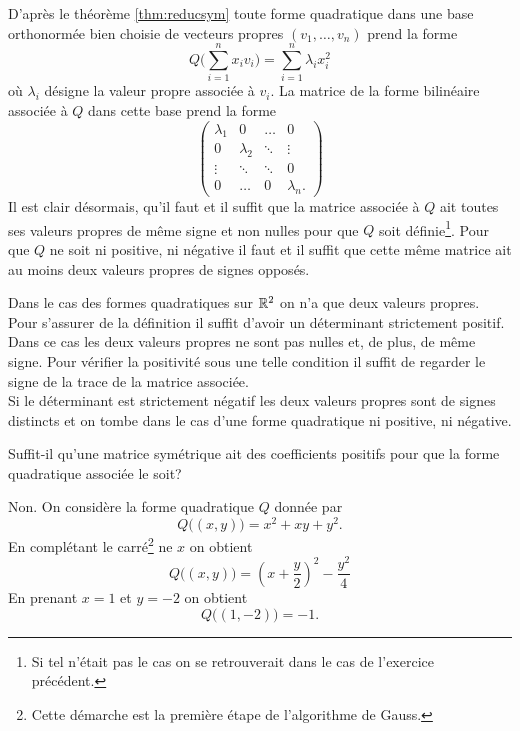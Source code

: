 \documentclass[11pt, a4paper]{article}
\begin{document}
\begin{solution}
  D'après le théorème \eqref{thm:reducsym} toute forme quadratique
  dans une base orthonormée bien choisie de vecteurs propres
  $(v_1, \ldots, v_n)$ prend la forme
  \[
  Q\Big(\sum_{i=1}^n x_i v_i\Big) = \sum_{i=1}^n \lambda_i x_i^2
  \]
  où $\lambda_i$ désigne la valeur propre associée à $v_i$. La matrice
  de la forme bilinéaire associée à $Q$ dans cette base prend la forme
  \[
  \begin{pmatrix}
    \lambda_1 & 0 & \hdots & 0 \\
    0 & \lambda_2 & \ddots & \vdots \\
    \vdots & \ddots & \ddots & 0 \\
    0 & \hdots & 0 & \lambda_n. 
  \end{pmatrix}
  \]
  Il est clair désormais, qu'il faut et il suffit que la matrice
  associée à $Q$ ait toutes ses valeurs propres de même signe et non
  nulles pour que $Q$ soit définie\footnote{Si tel n'était pas le cas
    on se retrouverait dans le cas de l'exercice précédent.}. Pour que
  $Q$ ne soit ni positive, ni négative il faut et il suffit que cette
  même matrice ait au moins deux valeurs propres de signes opposés.

  Dans le cas des formes quadratiques sur $\mathbb{R}^2$ on n'a que deux
  valeurs propres. Pour s'assurer de la définition il suffit d'avoir
  un déterminant strictement positif. Dans ce cas les deux valeurs
  propres ne sont pas nulles et, de plus, de même signe. Pour vérifier
  la positivité sous une telle condition il suffit de regarder le
  signe de la trace de la matrice associée. \\
  Si le déterminant est strictement négatif les deux valeurs propres
  sont de signes distincts et on tombe dans le cas d'une forme
  quadratique ni positive, ni négative.
\end{solution}

\begin{question}
  Suffit-il qu'une matrice symétrique ait des coefficients positifs
  pour que la forme quadratique associée le soit? 
\end{question}

\begin{solution}
  Non. On considère la forme quadratique $Q$ donnée par 
  \[
  Q\big((x,y)\big) = x^2 + xy + y^2.
  \]
  En complétant le carré\footnote{Cette démarche est la première étape
    de l'algorithme de Gauss.} ne $x$ on obtient
  \[
  Q\big((x, y)\big) = \left(x + \frac{y}{2}\right)^2 - \frac{y^2}{4}
  \]
  En prenant $x = 1$ et $y = -2$ on obtient 
  \[
  Q\big((1, -2)\big) = -1. 
  \]
\end{solution}
\end{document}
